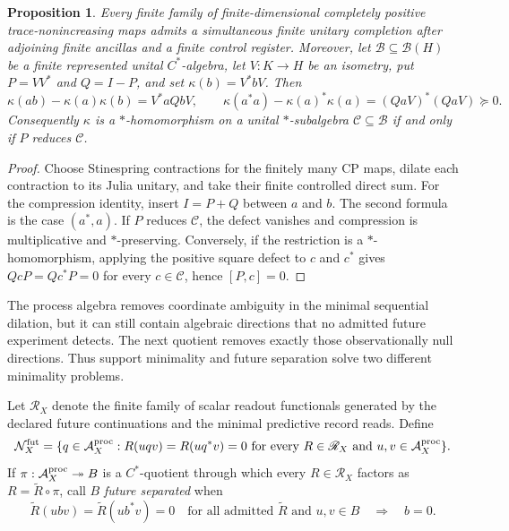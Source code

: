 \documentclass[11pt]{article}
\newtheorem{proposition}[proposition]{Proposition}
\theoremstyle{definition}
\theoremstyle{remark}
\theoremstyle{definition}
\theoremstyle{remark}
\newcommand{\A}{\mathcal A}
\begin{document}
\begin{proposition}
\label{prop:ncg-compression-defect}
Every finite family of finite-dimensional completely positive trace-nonincreasing
maps admits a simultaneous finite unitary completion after adjoining finite
ancillas and a finite control register.  Moreover, let
$\mathcal B\subseteq\mathcal B(H)$ be a finite represented unital $C^*$-algebra,
let $V:K\to H$ be an isometry, put $P=VV^*$ and $Q=I-P$, and set
$\kappa(b)=V^*bV$.  Then
\begin{equation}
 \kappa(ab)-\kappa(a)\kappa(b)=V^*aQbV,
 \qquad
 \kappa(a^*a)-\kappa(a)^*\kappa(a)=(QaV)^*(QaV)\succeq0.
 \label{eq:ncg-compression-square-defect}
\end{equation}
Consequently $\kappa$ is a $*$-homomorphism on a unital $*$-subalgebra
$\mathcal C\subseteq\mathcal B$ if and only if $P$ reduces $\mathcal C$.
\end{proposition}

\begin{proof}
Choose Stinespring contractions for the finitely many CP maps, dilate each
contraction to its Julia unitary, and take their finite controlled direct sum.
For the compression identity, insert $I=P+Q$ between $a$ and $b$.  The second
formula is the case $(a^*,a)$.  If $P$ reduces $\mathcal C$, the defect vanishes
and compression is multiplicative and $*$-preserving.  Conversely, if the
restriction is a $*$-homomorphism, applying the positive square defect to $c$
and $c^*$ gives $QcP=Qc^*P=0$ for every $c\in\mathcal C$, hence $[P,c]=0$.
\end{proof}

The process algebra removes coordinate ambiguity in the minimal sequential
dilation, but it can still contain algebraic directions that no admitted future
experiment detects.  The next quotient removes exactly those observationally null
directions.  Thus support minimality and future separation solve two different
minimality problems.

Let $\mathscr R_X$ denote the finite family of scalar readout functionals
generated by the declared future continuations and the minimal predictive record
reads.  Define
\begin{equation}
 \mathcal N_X^{\rm fut}
 =\{q\in\A_X^{\rm proc}:
 R(uqv)=R(uq^*v)=0\text{ for every }R\in\mathscr R_X
 \text{ and }u,v\in\A_X^{\rm proc}\}.
 \label{eq:ncg-contextual-null}
\end{equation}
If $\pi:\A_X^{\rm proc}\twoheadrightarrow B$ is a $C^*$-quotient through which
every $R\in\mathscr R_X$ factors as $R=\widetilde R\circ\pi$, call $B$
\emph{future separated} when
\begin{equation}
 \widetilde R(ubv)=\widetilde R(ub^*v)=0
 \quad\text{for all admitted }\widetilde R\text{ and }u,v\in B
 \quad\Longrightarrow\quad b=0.
 \label{eq:ncg-future-separated-definition}
\end{equation}
\end{document}
